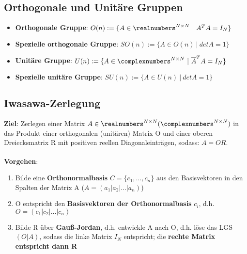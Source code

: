 \subsection{Orthogonale und Unitäre Gruppen}%
\label{os:sub:orthogonale_und_unitaere_gruppen}

\begin{itemize}
	\item \textbf{Orthogonale Gruppe}: $O(n) := \{A \in \realnumbers^{N\times N}\ |\ A^TA = I_N\}$
	\item \textbf{Spezielle orthogonale Gruppe}: $SO(n) := \{A \in O(n)\ |\ det A = 1\}$
	\item \textbf{Unitäre Gruppe}: $U(n) := \{A \in \complexnumbers^{N\times N}\ |\ \overline{A}^TA = I_N\}$
	\item \textbf{Spezielle unitäre Gruppe}: $SU(n) := \{A \in U(n)\ |\ det A = 1\}$
\end{itemize}

\subsection{Iwasawa-Zerlegung}%
\label{os:sub:iwasawa_zerlegung}

\textbf{Ziel}: Zerlegen einer Matrix $A \in \realnumbers^{N\times N} (\complexnumbers^{N\times N})$ in das Produkt einer orthogonalen (unitären) Matrix O und einer oberen Dreiecksmatrix R mit positiven reellen Diagonaleinträgen, sodass: $A = OR$.\\\\
\textbf{Vorgehen}:
\begin{enumerate}
	\item Bilde eine \textbf{Orthonormalbasis} $C = \{c_1, ..., c_n\}$ aus den Basisvektoren in den Spalten der Matrix A ($A = (a_1 | a_2 | ... | a_n)$)
	\item O entspricht den \textbf{Basisvektoren der Orthonormalbasis} $c_i$, d.h. $O = (c_1 | c_2 | ... | c_n)$
	\item Bilde R über \textbf{Gauß-Jordan}, d.h. entwickle A nach O, d.h. löse das LGS $(O | A)$, sodass die linke Matrix $I_N$ entspricht; die \textbf{rechte Matrix entspricht dann R}
\end{enumerate}